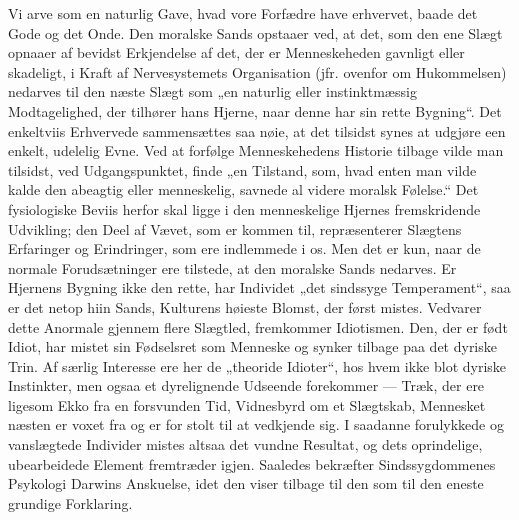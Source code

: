 \documentclass[12pt,a4paper,openany]{book}
\newcommand{\opage}[1]{\marginnote{\footnotesize\textit{[#1]}}}
\begin{document}
Vi arve som en naturlig Gave, hvad vore Forfædre
have erhvervet, baade det Gode og det Onde. Den moralske
Sands opstaaer ved, at det, som den ene Slægt opnaaer
af bevidst Erkjendelse af det, der er Menneskeheden gavnligt
eller skadeligt, i Kraft af Nervesystemets Organisation (jfr.
ovenfor om Hukommelsen) nedarves til den næste Slægt
som „en naturlig eller instinktmæssig Modtagelighed, der tilhører
hans Hjerne, naar denne har sin rette Bygning“. Det
enkeltviis Erhvervede sammensættes saa nøie, at det tilsidst
synes at udgjøre een enkelt, udelelig Evne. Ved at forfølge
Menneskehedens Historie tilbage vilde man tilsidst, ved Udgangspunktet,
finde „en Tilstand, som, hvad enten man vilde
kalde den abeagtig eller menneskelig, savnede al videre moralsk
Følelse.“ Det fysiologiske Beviis herfor skal ligge i den
menneskelige Hjernes fremskridende Udvikling; den Deel af
Vævet, som er kommen til, repræsenterer Slægtens Erfaringer
og Erindringer, som ere indlemmede i os. Men
det er kun, naar de normale Forudsætninger ere tilstede, at
den moralske Sands nedarves. Er Hjernens Bygning ikke
den rette, har Individet „det sindssyge Temperament“, saa
er det netop hiin Sands, Kulturens høieste Blomst, der først
mistes. Vedvarer dette Anormale gjennem flere Slægtled,
fremkommer Idiotismen. Den, der er født Idiot, har
\opage{327}mistet sin Fødselsret som Menneske og synker tilbage paa
det dyriske Trin. Af særlig Interesse ere her de „theoride
Idioter“, hos hvem ikke blot dyriske Instinkter, men ogsaa et
dyrelignende Udseende forekommer --- Træk, der ere ligesom
Ekko fra en forsvunden Tid, Vidnesbyrd om et Slægtskab,
Mennesket næsten er voxet fra og er for stolt til at vedkjende
sig. I saadanne forulykkede og vanslægtede Individer mistes
altsaa det vundne Resultat, og dets oprindelige, ubearbeidede
Element fremtræder igjen. Saaledes bekræfter Sindssygdommenes
Psykologi Darwins Anskuelse, idet den viser tilbage
til den som til den eneste grundige Forklaring.
\end{document}
